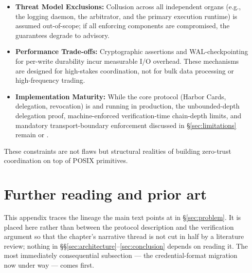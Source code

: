 \documentclass[11pt,a4paper]{article}
\theoremstyle{definition}
\begin{document}
\begin{itemize}
    \item \textbf{Threat Model Exclusions:} Collusion across all independent organs (e.g., the logging daemon, the arbitrator, and the primary execution runtime) is assumed out-of-scope; if all enforcing components are compromised, the guarantees degrade to advisory.
    \item \textbf{Performance Trade-offs:} Cryptographic assertions and WAL-checkpointing for per-write durability incur measurable I/O overhead. These mechanisms are designed for high-stakes coordination, not for bulk data processing or high-frequency trading.
    \item \textbf{Implementation Maturity:} While the core protocol (Harbor Cards, delegation, revocation) is  and running in production, the unbounded-depth delegation proof, machine-enforced verification-time chain-depth limits, and mandatory transport-boundary enforcement discussed in \S\ref{sec:limitations} remain  or .
\end{itemize}

These constraints are not flaws but structural realities of building zero-trust coordination on top of POSIX primitives.

\section{Further reading and prior art}\label{app:related}

This appendix traces the lineage the main text points at in \S\ref{sec:problem}. It is placed here rather than between the protocol description and the verification argument so that the chapter's narrative thread is not cut in half by a literature review; nothing in \S\S\ref{sec:architecture}--\ref{sec:conclusion} depends on reading it. The most immediately consequential subsection --- the credential-format migration now under way --- comes first.
\end{document}
